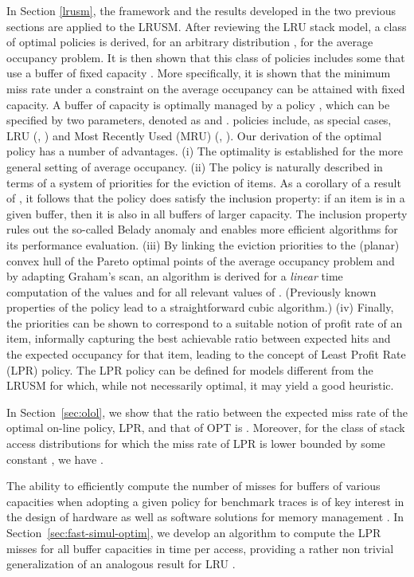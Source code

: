 \documentclass[11pt,a4paper]{article}
\theoremstyle{definition}
\theoremstyle{remark}
\begin{document}
In Section \ref{lrusm}, the framework and the results developed in the
two previous sections are applied to the LRUSM. After reviewing the
LRU stack model, a class of optimal policies is derived, for an
arbitrary distribution , for the average occupancy problem. It is
then shown that this class of policies includes some that use a buffer
of fixed capacity .  More specifically, it is shown that the
minimum miss rate under a constraint on the average occupancy can be
attained with fixed capacity. A buffer of capacity  is optimally
managed by a  policy \cite{WoodFL77,WoodFL83}, which can be
specified by two parameters, denoted as  and .  
policies include, as special cases, LRU (, ) and Most
Recently Used (MRU) (, ). Our derivation of the optimal
policy has a number of advantages. (i) The optimality is established
for the more general setting of average occupancy. (ii) The policy is
naturally described in terms of a system of priorities for the
eviction of items. As a corollary of a result of \cite{MattsonGST70},
it follows that the policy does satisfy the inclusion property: if an
item is in a given buffer, then it is also in all buffers of larger
capacity.  The inclusion property rules out the so-called Belady
anomaly
\cite{BeladyNS69} and enables more efficient algorithms for its
performance evaluation.  (iii) By linking the eviction priorities to
the (planar) convex hull of the Pareto optimal points of the average
occupancy problem and by adapting Graham's scan, an algorithm is
derived for a \emph{linear} time computation of the values  and
 for all relevant values of . (Previously known properties of
the  policy lead to a straightforward cubic algorithm.) (iv)
Finally, the priorities can be shown to correspond to a suitable
notion of profit rate of an item, informally capturing the best
achievable ratio between expected hits and the expected occupancy for
that item, leading to the concept of Least Profit Rate (LPR)
policy. The LPR policy can be defined for models different from the
LRUSM for which, while not necessarily optimal, it may yield a good
heuristic.

In Section~\ref{sec:olol}, we show that the ratio 
between the expected miss rate of the optimal on-line policy, LPR, and
that of OPT is . Moreover, for the class of stack access
distributions  for which the miss rate of LPR is lower bounded by
some constant , we have .

The ability to efficiently compute the number of misses for buffers of
various capacities when adopting a given policy for benchmark traces
is of key interest in the design of hardware as well as software
solutions for memory management
\cite{BilardiEP11,SugumarA93,ThompsonS89}.
In Section~\ref{sec:fast-simul-optim}, we develop an algorithm to compute the
LPR misses for all buffer capacities in time  per access, providing a
rather non trivial generalization of an analogous result for LRU
\cite{BennettK75,AlmasiCP02}.
\end{document}
